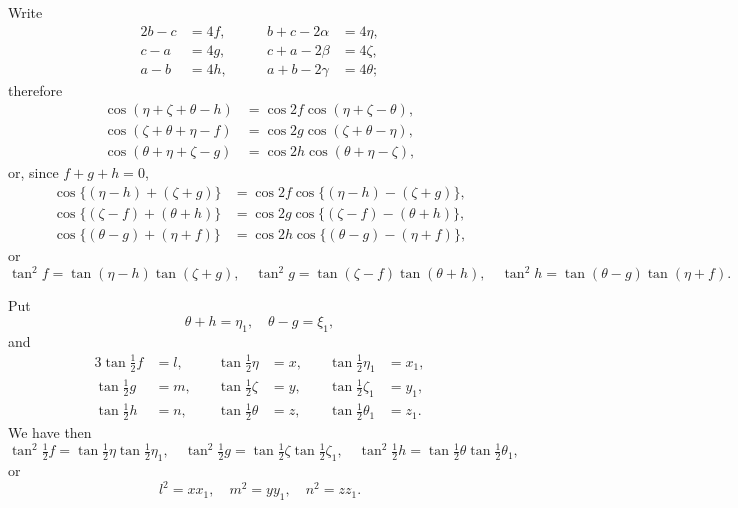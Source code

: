 \documentclass[11pt,a4paper]{book}
\begin{document}
Write
\begin{alignat*}{2}
b - c &= 4f, &\qquad b + c - 2\alpha &= 4\eta,\\
c - a &= 4g, &\qquad c + a - 2\beta  &= 4\zeta,\\
a - b &= 4h, &\qquad a + b - 2\gamma  &= 4\theta;
\end{alignat*}
therefore
\begin{align*}
\cos(\eta + \zeta + \theta - h) &= \cos 2f\cos(\eta + \zeta - \theta),\\
\cos(\zeta + \theta + \eta - f) &= \cos 2g\cos(\zeta + \theta - \eta),\\
\cos(\theta + \eta + \zeta - g) &= \cos 2h\cos(\theta + \eta - \zeta),
\end{align*}
or, since $f + g + h = 0$,
\begin{align*}
\cos\{(\eta - h) + (\zeta + g)\} &= \cos 2f\cos\{(\eta - h) - (\zeta + g)\},\\
\cos\{(\zeta - f) + (\theta + h)\} &= \cos 2g\cos\{(\zeta - f) - (\theta + h)\},\\
\cos\{(\theta - g) + (\eta + f)\} &= \cos 2h\cos\{(\theta - g) - (\eta + f)\},
\end{align*}
or
\[
\tan^2 f = \tan(\eta - h)\tan(\zeta + g),\quad
\tan^2 g = \tan(\zeta - f)\tan(\theta + h),\quad
\tan^2 h = \tan(\theta - g)\tan(\eta + f).
\]

Put
\[
\theta + h = \eta_1,\quad \theta - g = \xi_1,
\]
and
\begin{alignat*}{3}
\tan\tfrac{1}{2}f &= l, &\quad \tan\tfrac{1}{2}\eta &= x, &\quad \tan\tfrac{1}{2}\eta_1 &= x_1,\\
\tan\tfrac{1}{2}g &= m, &\quad \tan\tfrac{1}{2}\zeta &= y, &\quad \tan\tfrac{1}{2}\zeta_1 &= y_1,\\
\tan\tfrac{1}{2}h &= n, &\quad \tan\tfrac{1}{2}\theta &= z, &\quad \tan\tfrac{1}{2}\theta_1 &= z_1.
\end{alignat*}
We have then
\[
\tan^2\tfrac{1}{2}f = \tan\tfrac{1}{2}\eta\tan\tfrac{1}{2}\eta_1,\quad
\tan^2\tfrac{1}{2}g = \tan\tfrac{1}{2}\zeta\tan\tfrac{1}{2}\zeta_1,\quad
\tan^2\tfrac{1}{2}h = \tan\tfrac{1}{2}\theta\tan\tfrac{1}{2}\theta_1,
\]
or
\[
l^2 = xx_1,\quad m^2 = yy_1,\quad n^2 = zz_1.
\]
\end{document}
